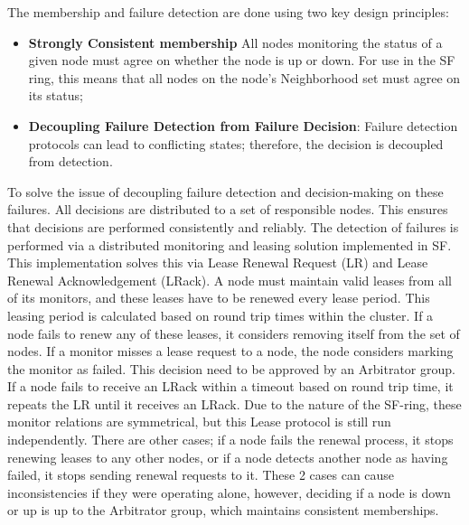 \documentclass[a4paper,10pt,titlepage]{report}
\begin{document}
    The membership and failure detection are done using two key design principles:\\
    \vspace{5mm}

    \begin{itemize}
        \item \textbf{Strongly Consistent membership} All nodes monitoring the status of a given node must agree on whether the node is up or down. For use in the SF ring, this means that all nodes on the node's Neighborhood set must agree on its status;
        \item \textbf{Decoupling Failure Detection from Failure Decision}: Failure detection protocols can lead to conflicting states; therefore, the decision is decoupled from detection.
    \end{itemize}
    \vspace{5mm}

    To solve the issue of decoupling failure detection and decision-making on these failures. All decisions are distributed to a set of responsible nodes. This ensures that decisions are performed consistently and reliably. The detection of failures is performed via a distributed monitoring and leasing solution implemented in SF. This implementation solves this via Lease Renewal Request (LR) and Lease Renewal Acknowledgement (LRack). A node must maintain valid leases from all of its monitors, and these leases have to be renewed every lease period. This leasing period is calculated based on round trip times within the cluster. If a node fails to renew any of these leases, it considers removing itself from the set of nodes. If a monitor misses a lease request to a node, the node considers marking the monitor as failed. This decision need to be approved by an Arbitrator group. If a node fails to receive an LRack within a timeout based on round trip time, it repeats the LR until it receives an LRack. Due to the nature of the SF-ring, these monitor relations are symmetrical, but this Lease protocol is still run independently. There are other cases; if a node fails the renewal process, it stops renewing leases to any other nodes, or if a node detects another node as having failed, it stops sending renewal requests to it. These 2 cases can cause inconsistencies if they were operating alone, however, deciding if a node is down or up is up to the Arbitrator group, which maintains consistent memberships. \\
    \vspace{5mm}
\end{document}
